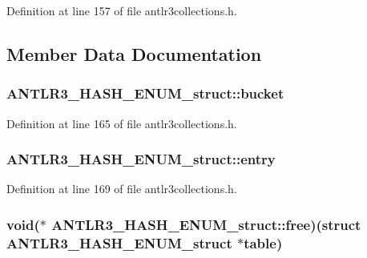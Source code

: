 Definition at line 157 of file antlr3collections.\-h.



\subsection{Member Data Documentation}
\hypertarget{struct_a_n_t_l_r3___h_a_s_h___e_n_u_m__struct_ad53b9a754de26c4fba1c9c6379279c65}{
\subsubsection[{bucket}]{ A\-N\-T\-L\-R3\-\_\-\-H\-A\-S\-H\-\_\-\-E\-N\-U\-M\-\_\-struct\-::bucket}}\label{struct_a_n_t_l_r3___h_a_s_h___e_n_u_m__struct_ad53b9a754de26c4fba1c9c6379279c65}


Definition at line 165 of file antlr3collections.\-h.

\hypertarget{struct_a_n_t_l_r3___h_a_s_h___e_n_u_m__struct_a0d890c54d35efa0166d2d780c08e6e57}{
\subsubsection[{entry}]{ A\-N\-T\-L\-R3\-\_\-\-H\-A\-S\-H\-\_\-\-E\-N\-U\-M\-\_\-struct\-::entry}}\label{struct_a_n_t_l_r3___h_a_s_h___e_n_u_m__struct_a0d890c54d35efa0166d2d780c08e6e57}


Definition at line 169 of file antlr3collections.\-h.

\hypertarget{struct_a_n_t_l_r3___h_a_s_h___e_n_u_m__struct_ab6e60503e41b2e8c95e3edd5a23e76aa}{
\subsubsection[{free}]{\setlength{\rightskip}{0pt plus 5cm}void($\ast$ A\-N\-T\-L\-R3\-\_\-\-H\-A\-S\-H\-\_\-\-E\-N\-U\-M\-\_\-struct\-::free)(struct {\bf A\-N\-T\-L\-R3\-\_\-\-H\-A\-S\-H\-\_\-\-E\-N\-U\-M\-\_\-struct} $\ast${\bf table})}}\label{struct_a_n_t_l_r3___h_a_s_h___e_n_u_m__struct_ab6e60503e41b2e8c95e3edd5a23e76aa}


